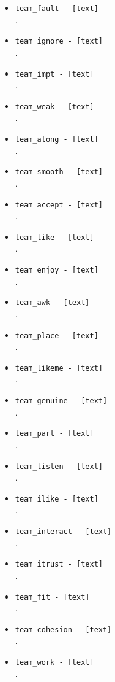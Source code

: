 \begin{description}
\begin{addmargin}[0em]{0em}
\begin{addmargin}[1em]{0em}
\begin{itemize}
            \item \verb|team_fault - [text]|\\.
            \item \verb|team_ignore - [text]|\\.
            \item \verb|team_impt - [text]|\\.
            \item \verb|team_weak - [text]|\\.
            \item \verb|team_along - [text]|\\.
            \item \verb|team_smooth - [text]|\\.
            \item \verb|team_accept - [text]|\\.
            \item \verb|team_like - [text]|\\.
            \item \verb|team_enjoy - [text]|\\.
            \item \verb|team_awk - [text]|\\.
            \item \verb|team_place - [text]|\\.
            \item \verb|team_likeme - [text]|\\.
            \item \verb|team_genuine - [text]|\\.
            \item \verb|team_part - [text]|\\.
            \item \verb|team_listen - [text]|\\.
            \item \verb|team_ilike - [text]|\\.
            \item \verb|team_interact - [text]|\\.
            \item \verb|team_itrust - [text]|\\.
            \item \verb|team_fit - [text]|\\.
            \item \verb|team_cohesion - [text]|\\.
            \item \verb|team_work - [text]|\\.

\end{itemize}
\end{addmargin}
\end{addmargin}
\end{description}
